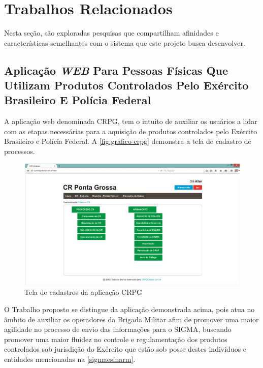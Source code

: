 \chapter{Trabalhos Relacionados}
Nesta seção, são exploradas pesquisas que compartilham afinidades e características semelhantes com o sistema que este projeto busca desenvolver.
   
\section{Aplicação \textit{WEB} Para Pessoas Físicas Que Utilizam Produtos Controlados Pelo Exército
Brasileiro E Polícia Federal}
A aplicação web denominada CRPG, tem o intuito de auxiliar os usuários a lidar com as etapas necessárias para a aquisição de produtos controlados pelo Exército Brasileiro e Polícia Federal. A \autoref{fig:grafico-crpg} demonstra a tela de cadastro de processos.

\begin{figure}[htb]
    \caption{\label{fig:grafico-crpg}Tela de cadastros da aplicação CRPG}
    \begin{center}
        \includegraphics[scale=0.9]{imagens/crpg.png}
    \end{center}
\end{figure}

O Trabalho proposto se distingue da aplicação demonstrada acima, pois atua no âmbito de auxiliar os operadores da Brigada Militar afim de promover uma maior agilidade no processo de envio das informações para o SIGMA, buscando promover uma maior fluidez no controle e regulamentação dos produtos controlados sob jurisdição do Exército que estão sob posse destes indivíduos e entidades mencionadas na \autoref{sigmaesinarm}.



